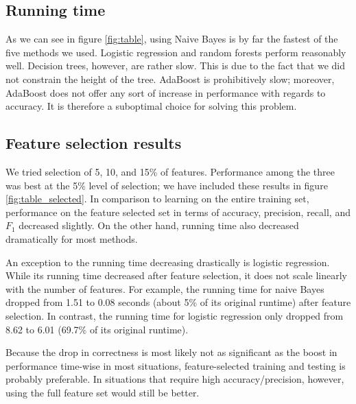 \documentclass{article} %
\begin{document}
\subsection{Running time}
As we can see in figure \ref{fig:table}, using Naive Bayes is by far the fastest of the five methods we used. Logistic regression and random forests perform reasonably well. Decision trees, however, are rather slow. This is due to the fact that we did not constrain the height of the tree. AdaBoost is prohibitively slow; moreover, AdaBoost does not offer any sort of increase in performance with regards to accuracy. It is therefore a suboptimal choice for solving this problem. 

\subsection{Feature selection results}
We tried selection of 5, 10, and 15\% of features. Performance among the three was best at the 5\% level of selection; we have included these results in figure \ref{fig:table_selected}. In comparison to learning on the entire training set, performance on the feature selected set in terms of accuracy, precision, recall, and $F_1$ decreased slightly. On the other hand, running time also decreased dramatically for most methods.  

An exception to the running time decreasing drastically is logistic regression. While its running time decreased after feature selection, it does not scale linearly with the number of features. For example, the running time for naive Bayes dropped from 1.51 to 0.08 seconds (about 5\% of its original runtime) after feature selection. In contrast, the running time for logistic regression only dropped from 8.62 to 6.01 (69.7\% of its original runtime). 

Because the drop in correctness is most likely not as significant as the boost in performance time-wise in most situations, feature-selected training and testing is probably preferable. In situations that require high accuracy/precision, however, using the full feature set would still be better. 
\end{document}
